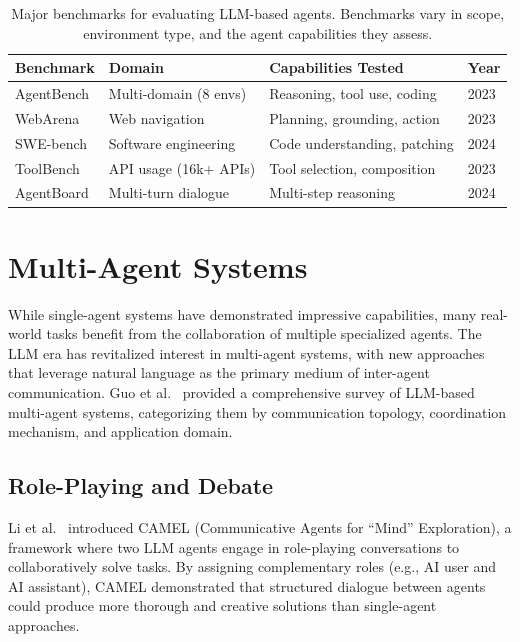 \documentclass[11pt,a4paper]{article}
\begin{document}
\begin{table}[tbp]
\centering
\caption{Major benchmarks for evaluating LLM-based agents. Benchmarks vary in scope, environment type, and the agent capabilities they assess.}
\label{tab:benchmarks}
\begin{tabular}{@{}llll@{}}
\toprule
\textbf{Benchmark} & \textbf{Domain} & \textbf{Capabilities Tested} & \textbf{Year} \\
\midrule
AgentBench       & Multi-domain (8 envs)  & Reasoning, tool use, coding  & 2023 \\
WebArena         & Web navigation         & Planning, grounding, action  & 2023 \\
SWE-bench        & Software engineering   & Code understanding, patching & 2024 \\
ToolBench        & API usage (16k+ APIs)  & Tool selection, composition  & 2023 \\
AgentBoard       & Multi-turn dialogue    & Multi-step reasoning         & 2024 \\
\bottomrule
\end{tabular}
\end{table}

\section{Multi-Agent Systems}
\label{sec:multiagent}

While single-agent systems have demonstrated impressive capabilities, many real-world tasks benefit from the collaboration of multiple specialized agents. The LLM era has revitalized interest in multi-agent systems, with new approaches that leverage natural language as the primary medium of inter-agent communication. Guo et al.~\citep{guo2024large} provided a comprehensive survey of LLM-based multi-agent systems, categorizing them by communication topology, coordination mechanism, and application domain.

\subsection{Role-Playing and Debate}

Li et al.~\citep{li2023camel} introduced CAMEL (Communicative Agents for ``Mind'' Exploration), a framework where two LLM agents engage in role-playing conversations to collaboratively solve tasks. By assigning complementary roles (e.g., AI user and AI assistant), CAMEL demonstrated that structured dialogue between agents could produce more thorough and creative solutions than single-agent approaches.
\end{document}
